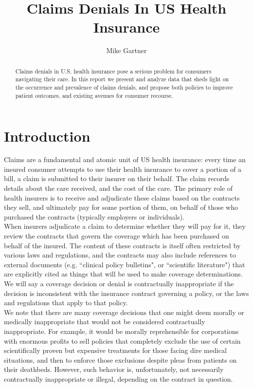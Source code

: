 \documentclass[12pt, a4paper]{report}
\title{Claims Denials In US Health Insurance}
\author{Mike Gartner}
\begin{document}
	
\maketitle


\begin{abstract}
Claims denials in U.S. health insurance pose a serious problem for consumers
navigating their care. In this report we present and analyze data that sheds
light on the occurrence and prevalence of claims denials, and propose both policies
to improve patient outcomes, and existing avenues for consumer recourse.
\end{abstract}



{
	\hypersetup{linkcolor=black}
	\tableofcontents
}
	

\section{Introduction}
\label{Introduction}
Claims are a fundamental and atomic unit of US health insurance: every time an insured consumer attempts to use their health insurance to cover a portion of a bill, a claim is submitted to their insurer on their behalf. The claim records details about the care received, and the cost of the care. The primary role of health insurers is to receive and adjudicate these claims based on the contracts they sell, and ultimately pay for some portion of them, on behalf of those who purchased the contracts (typically employers or individuals).\\

When insurers adjudicate a claim to determine whether they will pay for it, they review the contracts that govern the coverage which has been purchased on behalf of the insured. The content of these contracts is itself often restricted by various laws and regulations, and the contracts may also include references to external documents (e.g. ``clinical policy bulletins", or ``scientific literature") that are explicitly cited as things that will be used to make coverage determinations. We will say a coverage decision or denial is contractually inappropriate if the decision is inconsistent with the insurance contract governing a policy, or the laws and regulations that apply to that policy.\\

We note that there are many coverage decisions that one might deem morally or medically inappropriate that would not be considered contractually inappropriate. For example, it would be morally reprehensible for corporations with enormous profits to sell policies that completely exclude the use of certain scientifically proven but expensive treatments for those facing dire medical situations, and then to enforce those exclusions despite pleas from patients on their deathbeds. However, such behavior is, unfortunately, not necessarily contractually inappropriate or illegal, depending on the contract in question.\\
\end{document}
